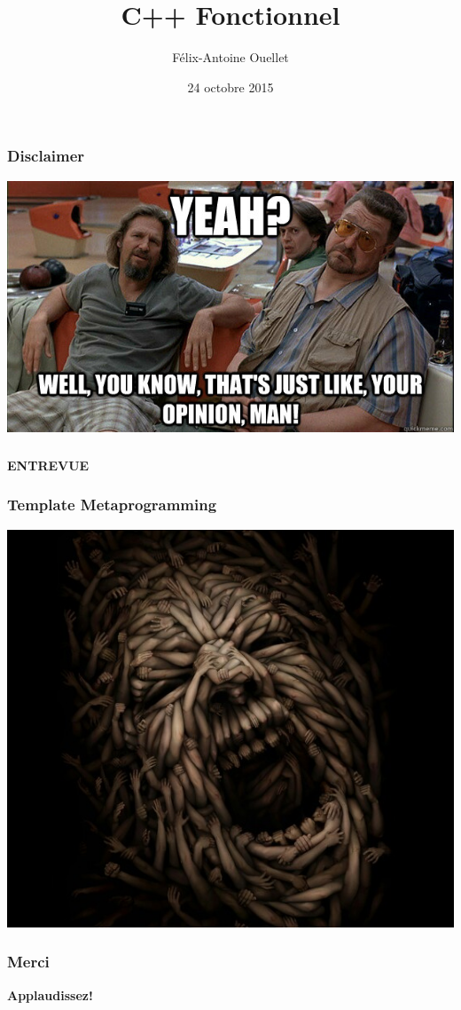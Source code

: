 \documentclass{beamer}
\author[Félix-Antoine Ouellet]{Félix-Antoine Ouellet}
\title[Functional\hspace{2em}\insertframenumber/\inserttotalframenumber]{C++ Fonctionnel}
\date{24 octobre 2015}
\begin{document}
\begin{frame}
\titlepage %
\end{frame}

\begin{frame}
\frametitle{Disclaimer}
\begin{center}
\includegraphics[scale=0.49]{dude.jpg}
\end{center}
\end{frame}

\begin{frame}
\frametitle{}
\begin{center}
\Huge{\textbf{ENTREVUE}}
\end{center}
\end{frame}

\begin{frame}
\frametitle{Template Metaprogramming}
\begin{center}
\includegraphics[scale=0.4]{TMP.jpg}
\end{center}
\end{frame}

\begin{frame}
\frametitle{Merci}
\begin{center}
\Huge{\textbf{Applaudissez!}}
\end{center}
\end{frame}
\end{document}
